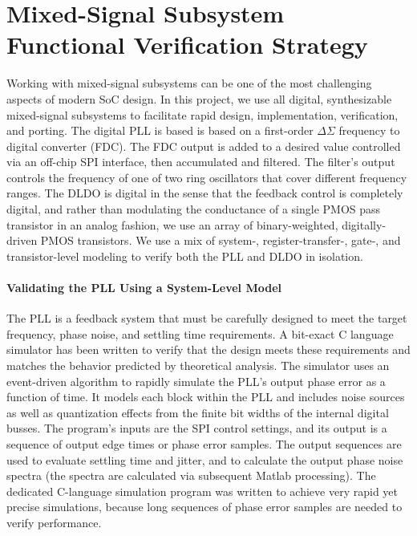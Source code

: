 
\section{Mixed-Signal Subsystem Functional Verification Strategy}

Working with mixed-signal subsystems can be one of the most challenging
aspects of modern SoC design. In this project, we use all digital,
synthesizable mixed-signal subsystems to facilitate rapid design,
implementation, verification, and porting. The digital PLL is based is
based on a first-order $\Delta\Sigma$ frequency to digital converter
(FDC). The FDC output is added to a desired value controlled via an
off-chip SPI interface, then accumulated and filtered. The filter's
output controls the frequency of one of two ring oscillators that cover
different frequency ranges. The DLDO is digital in the sense that the
feedback control is completely digital, and rather than modulating the
conductance of a single PMOS pass transistor in an analog fashion, we use an array of
binary-weighted, digitally-driven PMOS transistors. We use a mix of
system-, register-transfer-, gate-, and transistor-level modeling to
verify both the PLL and DLDO in isolation.

\paragraph{Validating the PLL Using a System-Level Model}
The PLL is a feedback system that must be carefully designed to meet the
target frequency, phase noise, and settling time requirements. A
bit-exact C language simulator has been written to verify that the design
meets these requirements and matches the behavior predicted by
theoretical analysis. The simulator uses an event-driven algorithm to
rapidly simulate the PLL's output phase error as a function of time. It
models each block within the PLL and includes noise sources as well as
quantization effects from the finite bit widths of the internal digital
busses. The program's inputs are the SPI control settings, and its output
is a sequence of output edge times or phase error samples. The output
sequences are used to evaluate settling time and jitter, and to calculate
the output phase noise spectra (the spectra are calculated via subsequent
Matlab processing). The dedicated C-language simulation program was
written to achieve very rapid yet precise simulations, because long
sequences of phase error samples are needed to verify performance.

